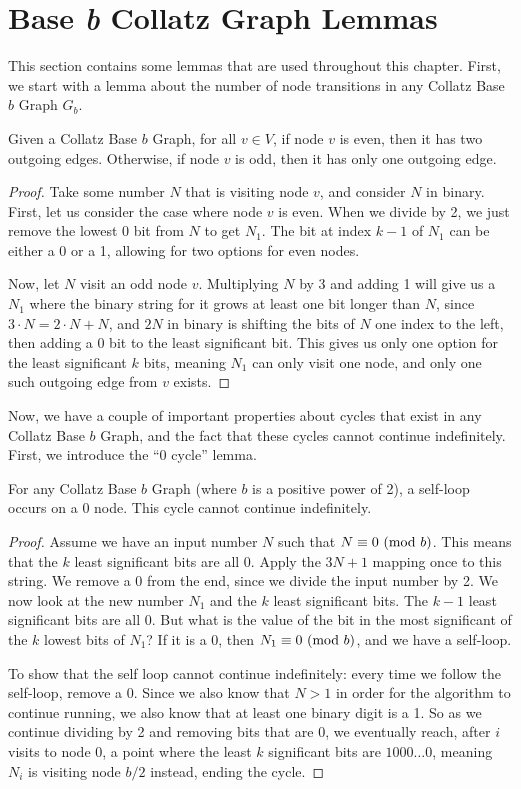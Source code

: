 \section{Base \textit{b} Collatz Graph Lemmas}
This section contains some lemmas that are used throughout this chapter. First, we start with a lemma about the number of node transitions in any Collatz Base $b$ Graph $G_b$.
\begin{lemma}
\label{lem:numOutEdges}
Given a Collatz Base $b$ Graph, for all $v \in V$, if node $v$ is even, then it has two outgoing edges. Otherwise, if node $v$ is odd, then it has only one outgoing edge.
\end{lemma}
\begin{proof}
Take some number $N$ that is visiting node $v$, and consider $N$ in binary. First, let us consider the case where node $v$ is even. When we divide by 2, we just remove the lowest 0 bit from $N$ to get $N_{1}$. The bit at index $k-1$ of $N_{1}$ can be either a 0 or a 1, allowing for two options for even nodes. \par
Now, let $N$ visit an odd node $v$. Multiplying $N$ by 3 and adding 1 will give us a $N_1$ where the binary string for it grows at least one bit longer than $N$, since $3\cdot N = 2 \cdot N + N$, and $2N$ in binary is shifting the bits of $N$ one index to the left, then adding a 0 bit to the least significant bit. This gives us only one option for the least significant $k$ bits, meaning $N_1$ can only visit one node, and only one such outgoing edge from $v$ exists.
\end{proof}
Now, we have a couple of important properties about cycles that exist in any Collatz Base $b$ Graph, and the fact that these cycles cannot continue indefinitely. First, we introduce the ``0 cycle'' lemma.
\begin{lemma}
\label{lem:zeroCycle}
For any Collatz Base $b$ Graph (where $b$ is a positive power of 2), a self-loop occurs on a 0 node. This cycle cannot continue indefinitely.
\end{lemma}
\begin{proof}
Assume we have an input number $N$ such that $N \equiv 0 \ (\mathrm{mod}\ b)$. This means that the $k$ least significant bits are all 0. Apply the $3N+1$ mapping once to this string. We remove a 0 from the end, since we divide the input number by 2. We now look at the new number $N_1$ and the $k$ least significant bits. The $k-1$ least significant bits are all 0. But what is the value of the bit in the most significant of the $k$ lowest bits of $N_1$? If it is a 0, then $N_1 \equiv 0 \ (\mathrm{mod}\ b)$, and we have a self-loop. \par
To show that the self loop cannot continue indefinitely: every time we follow the self-loop, remove a 0. Since we also know that $N > 1$ in order for the algorithm to continue running, we also know that at least one binary digit is a 1. So as we continue dividing by 2 and removing bits that are 0, we eventually reach, after $i$ visits to node 0, a point where the least $k$ significant bits are $1000\ldots 0$, meaning $N_i$ is visiting node $b/2$ instead, ending the cycle.
\end{proof}
